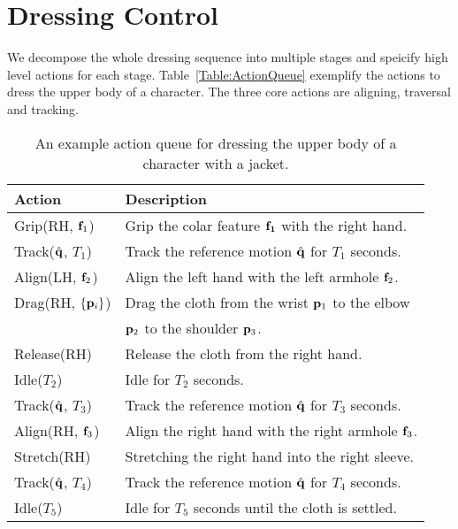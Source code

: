 \section{Dressing Control}

We decompose the whole dressing sequence into multiple stages and speicify high level actions for each stage. Table~\ref{Table:ActionQueue} exemplify the actions to dress the upper body of a character. The three core actions are aligning, traversal and tracking.

\begin{table}
  \centering
  \begin{tabular}{|l|l|}
    \hline
    Action & Description \\
    \hline
    Grip(RH, $\mathbf{f}_{1}$) & Grip the colar feature $\mathbf{f_1}$  with the right hand.\\
    Track($\hat{\mathbf{q}}$, $T_1$) & Track the reference motion $\hat{\mathbf{q}}$ for $T_1$ seconds.\\
    Align(LH, $\mathbf{f}_{2}$) & Align the left hand with the left armhole $\mathbf{f}_2$.\\
    Drag(RH, $\{\mathbf{p}_i\}$) & Drag the cloth from the wrist $\mathbf{p}_1$ to the elbow\\
    &                          $\mathbf{p}_2$ to the shoulder $\mathbf{p}_3$.\\
    Release(RH) & Release the cloth from the right hand.\\
    Idle($T_2$) & Idle for $T_2$ seconds.\\
    Track($\hat{\mathbf{q}}$, $T_3$) & Track the reference motion $\hat{\mathbf{q}}$ for $T_3$ seconds.\\
    Align(RH, $\mathbf{f}_{3}$) & Align the right hand with the right armhole $\mathbf{f}_3$.\\
    Stretch(RH) & Stretching the right hand into the right sleeve.\\
    Track($\hat{\mathbf{q}}$, $T_4$) & Track the reference motion $\hat{\mathbf{q}}$ for $T_4$ seconds. \\
    Idle($T_5$) & Idle for $T_5$ seconds until the cloth is settled.\\
    \hline
  \end{tabular}
  \caption{An example action queue for dressing the upper body of a character with a jacket.}
\end{table}


